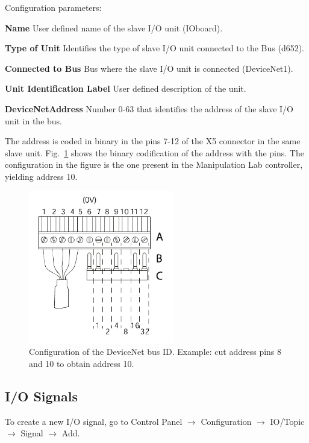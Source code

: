 \documentclass[letterpaper,notitlepage,10pt]{article}
\begin{document}
Configuration parameters:
\begin{description}
\item \textbf{Name} User defined name of the slave I/O unit (IOboard).
\item \textbf{Type of Unit} Identifies the type of slave I/O unit
  connected to the Bus (d652).
\item \textbf{Connected to Bus} Bus where the slave I/O unit is
  connected (DeviceNet1).
\item \textbf{Unit Identification Label} User defined description of
  the unit.
\item \textbf{DeviceNetAddress} Number 0-63 that identifies the
  address of the slave I/O unit in the bus.
  
  The address is coded in binary in the pins 7-12 of the X5 connector
  in the same slave unit.  Fig.~\ref{fig:busID} shows the binary
  codification of the address with the pins. The configuration in the
  figure is the one present in the Manipulation Lab controller,
  yielding address 10.
%
\begin{figure}[h]
	\centering
		\includegraphics[width=2.5in]{figures/busID}
                \caption{Configuration of the DeviceNet bus
                  ID. Example: cut address pins 8 and 10 to obtain
                  address 10.}
	\label{fig:busID}
\end{figure}
%
\end{description}

\subsection{I/O Signals}
To create a new I/O signal, go to Control Panel $\rightarrow$
Configuration $\rightarrow$ IO/Topic $\rightarrow$ Signal
$\rightarrow$ Add.
\\
\end{document}
